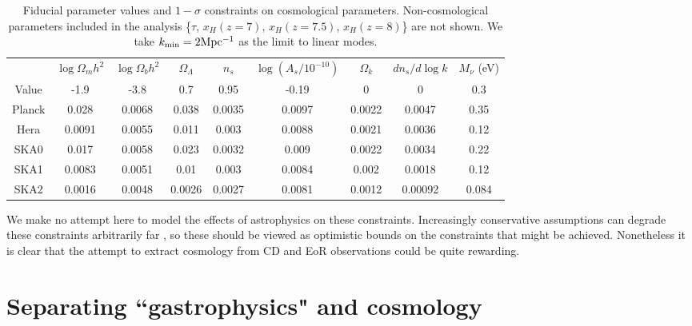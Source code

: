 \documentclass{PoS}
\begin{document}
\begin{table}[htdp]
\caption{Fiducial parameter values and $1-\sigma$ constraints on cosmological parameters. Non-cosmological parameters included in the analysis \{$\tau$, $x_H(z=7)$, $x_H(z=7.5)$, $x_H(z=8)$\} are not shown. We take $k_{\rm min}=2{\rm Mpc^{-1}}$ as the limit to linear modes.}
\begin{center}
\begin{tabular}{c|cccccccc}
\hline
 & $\log\Omega_mh^2$ & $\log\Omega_bh^2$ & $\Omega_\Lambda$ & $n_s$ & $\log (A_s/10^{-10})$ & $\Omega_k$ & $dn_s/d\log k$ & $M_\nu$ (eV) \\
Value & -1.9 & -3.8 & 0.7 & 0.95 & -0.19 & 0 & 0 & 0.3\\
\hline
Planck & 0.028 & 0.0068 & 0.038 & 0.0035 & 0.0097 & 0.0022 & 0.0047 & 0.35 \\
Hera & 0.0091 & 0.0055 & 0.011 & 0.003 & 0.0088 & 0.0021 & 0.0036 & 0.12  \\
SKA0 & 0.017 & 0.0058 & 0.023 & 0.0032 & 0.009 & 0.0022 & 0.0034 & 0.22  \\
SKA1 & 0.0083 & 0.0051 & 0.01 & 0.003 & 0.0084 & 0.002 & 0.0018 & 0.12  \\
SKA2 & 0.0016 & 0.0048 & 0.0026 & 0.0027 & 0.0081 & 0.0012 & 0.00092 & 0.084 
\end{tabular}
\end{center}
\label{tab:constraints}
\end{table}

We make no attempt here to model the effects of astrophysics on these constraints. Increasingly conservative assumptions can degrade these constraints arbitrarily far \citep{2008PhRvD..78b3529M}, so these should be viewed as optimistic bounds on the constraints that might be achieved. Nonetheless it is clear that the attempt to extract cosmology from CD and EoR observations could be quite rewarding. 


\section{Separating ``gastrophysics" and cosmology}
\label{sec:separation}
\end{document}

